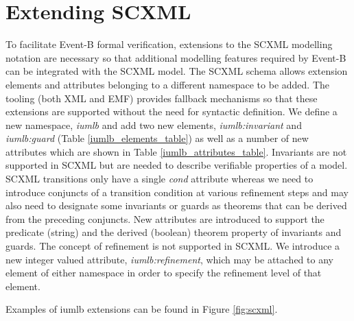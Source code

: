 
\section{Extending SCXML}
\label{sect:extension}


To facilitate Event-B formal verification, extensions to the SCXML 
modelling notation are necessary so that additional modelling features 
required by Event-B can be integrated with the SCXML model.
The SCXML schema allows extension elements and attributes belonging 
to a different namespace to be added. The tooling (both XML and EMF) 
provides fallback mechanisms so that these extensions are supported 
without the need for syntactic definition. We define a new namespace,  
\emph{iumlb} and add two new elements, \emph{iumlb:invariant} and 
\emph{iumlb:guard} (Table \ref{iumlb_elements_table}) as well as a 
number of new attributes which are shown in Table \ref{iumlb_attributes_table}.
Invariants are not supported in SCXML but are needed to describe 
verifiable properties of a model. SCXML transitions only have a single 
\emph{cond} attribute whereas we need to introduce conjuncts of a transition
condition at various refinement steps and may also need to designate some 
invariants or guards as theorems that can be derived from the preceding conjuncts. 
New attributes are introduced to support the predicate (string) and the 
derived (boolean) theorem property of invariants and guards. The concept 
of refinement is not supported in SCXML. We introduce a new integer valued 
attribute, \emph{iumlb:refinement}, which may be attached to any element of 
either namespace in order to specify the refinement level of that element. 

Examples of iumlb extensions can be found in Figure \ref{fig:scxml}.




